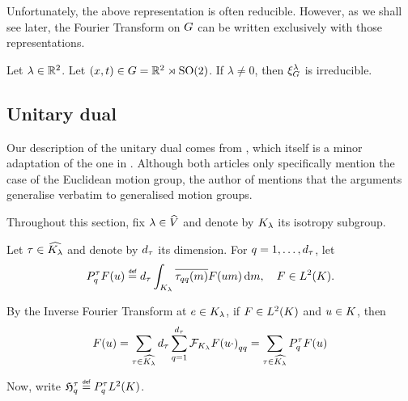Unfortunately, the above representation is often reducible.
However, as we shall see later, the Fourier Transform on $\Group$ can be written exclusively with those representations.

\begin{example}
    Let $\lambda \in \R^2$.
    Let $(x, t) \in \Group = \R^2 \rtimes \SpecialOrthogonalGroup{2}$.
    If $\lambda \neq 0$, then $\Rep{\lambda}$ is irreducible.
\end{example}

\subsection{Unitary dual}

Our description of the unitary dual comes from \cite{Kumahara73},
which itself is a minor adaptation of the one in \cite{Ito52}.
Although both articles only specifically mention the case of the Euclidean motion group,
the author of \cite{Ito52} mentions that the arguments generalise verbatim to generalised motion groups.

Throughout this section, fix $\lambda \in \dualGroup{\VectorSpace}$
and denote by $\IsotropySubgroup{\CompactGroup}{\lambda}$ its isotropy subgroup.

Let $\tau \in \dualGroup{\IsotropySubgroup{\CompactGroup}{\lambda}}$ and denote by $\dimRep{\tau}$ its dimension.
For $q = 1, \dots, \dimRep{\tau}$, let
\begin{align}
    P^\tau_q F(u) \defeq \dimRep{\tau} \int_\IsotropySubgroup{\CompactGroup}{\lambda} \conj{\tau_{qq}(m)} F(u m) \dd m,
    \quad F \in \Lebesgue{2}{\CompactGroup}.
    \label{eq:projection_on_L2_of_the_compact_group}
\end{align}

By the Inverse Fourier Transform at $e \in \IsotropySubgroup{\CompactGroup}{\lambda}$,
if $F \in \Lebesgue{2}{\CompactGroup}$ and $u \in \CompactGroup$, then
\begin{align}
    F(u)
    = \sum_{\tau \in \dualGroup{\IsotropySubgroup{\CompactGroup}{\lambda}}} \dimRep{\tau} \sum_{q = 1}^{\dimRep{\tau}} {\Fourier[\IsotropySubgroup{\CompactGroup}{\lambda}]{F(u \dummy)}}_{qq}
    = \sum_{\tau \in \dualGroup{\IsotropySubgroup{\CompactGroup}{\lambda}}} P^\tau_q F(u)
\end{align}

Now, write $\Hilbert{\tau}{q} \defeq P^\tau_q \Lebesgue{2}{\CompactGroup}$.


